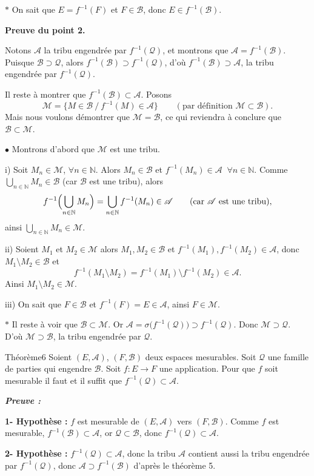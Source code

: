 \documentclass[11pt,a4paper]{article}
\newcommand{\N}{\mathbb{N}}
\newcommand{\A}{\mathscr{A}}
\newcommand{\B}{\mathscr{B}}
\newcommand{\M}{\mathscr{M}}
\newcommand{\Qq}{\mathscr{Q}}
\newenvironment{preuve}{\par\textit{\textbf{Preuve :}}\par\nopagebreak[4]}{\par}
\begin{document}
$\ast$ On sait que $E=f^{-1}(F)$ et $F\in\B$, donc $E\in f^{-1}(\B)$.

\medskip
\textbf{Preuve du point 2.}

Notons $\A$ la tribu engendrée par $f^{-1}(\Qq)$, et montrons que $\A=f^{-1}(\B)$.
Puisque $\B\supset\Qq$, alors $f^{-1}(\B)\supset f^{-1}(\Qq)$, d'où $f^{-1}(\B)\supset\A$,
la tribu engendrée par $f^{-1}(\Qq)$.

Il reste à montrer que $f^{-1}(\B)\subset\A$. Posons
\[
  \M=\bigl\{M\in\B \ \big/\ f^{-1}(M)\in\A\bigr\}\qquad(\text{par définition } \M\subset\B).
\]
Mais nous voulons démontrer que $\M=\B$, ce qui reviendra à conclure que $\B\subset\M$.

$\bullet$ Montrons d'abord que $\M$ est une tribu.

i) Soit $M_n\in\M$, $\forall n\in\N$. Alors $M_n\in\B$ et $f^{-1}(M_n)\in\A$ $\ \forall n\in\N$.
Comme $\bigcup_{n\in\N}M_n\in\B$ (car $\B$ est une tribu), alors
\[
  f^{-1}\Bigl(\bigcup_{n\in\N}M_n\Bigr)=\bigcup_{n\in\N}f^{-1}(M_n)\in\A\qquad(\text{car }\A\text{ est une tribu}),
\]
ainsi $\bigcup_{n\in\N}M_n\in\M$.

ii) Soient $M_1$ et $M_2\in\M$ alors $M_1,M_2\in\B$ et $f^{-1}(M_1),f^{-1}(M_2)\in\A$, donc
$M_1\setminus M_2\in\B$ et
\[
  f^{-1}(M_1\setminus M_2)=f^{-1}(M_1)\setminus f^{-1}(M_2)\in\A .
\]
Ainsi $M_1\setminus M_2\in\M$.

iii) On sait que $F\in\B$ et $f^{-1}(F)=E\in\A$, ainsi $F\in\M$.

$\ast$ Il reste à voir que $\B\subset\M$. Or $\A=\sigma\bigl(f^{-1}(\Qq)\bigr)\supset f^{-1}(\Qq)$.
Donc $\M\supset\Qq$. D'où $\M\supset\B$, la tribu engendrée par $\Qq$.

\begin{enonce}{Théorème}{6}
Soient $(E,\A)$, $(F,\B)$ deux espaces mesurables. Soit $\Qq$ une famille de parties qui engendre $\B$.
Soit $f:E\to F$ une application. Pour que $f$ soit mesurable il faut et il suffit que $f^{-1}(\Qq)\subset\A$.
\end{enonce}

\begin{preuve}\end{preuve}
\textbf{1- Hypothèse :} $f$ est mesurable de $(E,\A)$ vers $(F,\B)$. Comme $f$ est mesurable, $f^{-1}(\B)\subset\A$,
or $\Qq\subset\B$, donc $f^{-1}(\Qq)\subset\A$.

\textbf{2- Hypothèse :} $f^{-1}(\Qq)\subset\A$, donc la tribu $\A$ contient aussi la tribu engendrée par
$f^{-1}(\Qq)$, donc $\A\supset f^{-1}(\B)$ d'après le théorème 5.
\end{document}
